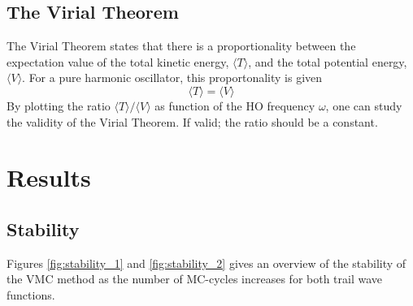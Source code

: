 \documentclass[12pt,english,a4paper]{article}
\begin{document}
\subsection{The Virial Theorem} \label{section:theory:virial}

The Virial Theorem states that there is a proportionality between the expectation value of the total kinetic energy, $\langle T\rangle$, and the total potential energy, $\langle V\rangle$. For a pure harmonic oscillator, this proportonality is given
\begin{equation}
    \langle T\rangle = \langle V\rangle
    \label{virial_theorem}
\end{equation}
By plotting the ratio $\langle T\rangle / \langle V\rangle$ as function of the HO frequency $\omega$, one can study the validity of the Virial Theorem. If valid; the ratio should be a constant.

\section{Results} \label{section:results}

\subsection{Stability} \label{section:results:stability}

Figures \ref{fig:stability_1} and \ref{fig:stability_2} gives an overview of the stability of the VMC method as the number of MC-cycles increases for both trail wave functions.
\end{document}
